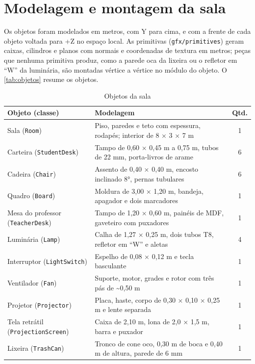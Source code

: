\documentclass[
  12pt,          %
  oneside,       %
  a4paper,       %
  chapter=TITLE, %
  english,
  brazil,        %
]{abntex2}
\newcommand{\fonteautores}{\fonte{Elaborado pelos autores (2026).}}
\begin{document}
\chapter{Modelagem e montagem da sala}
\label{cap:modelagem}

Os objetos foram modelados em metros, com Y para cima, e com a frente de cada objeto voltada para +Z no
espaço local. As primitivas (\texttt{gfx/primitives}) geram caixas, cilindros e planos com normais e
coordenadas de textura em metros; peças que nenhuma primitiva produz, como a parede oca da lixeira ou o
refletor em ``W'' da luminária, são montadas vértice a vértice no módulo do objeto. O \autoref{tab:objetos}
resume os objetos.

\begin{table}[htb]
  \centering
  \caption{Objetos da sala}
  \label{tab:objetos}
  \footnotesize
  \begin{tabularx}{\textwidth}{|l|X|c|}
    \hline
    \textbf{Objeto (classe)} & \textbf{Modelagem} & \textbf{Qtd.} \\
    \hline
    Sala (\texttt{Room}) & Piso, paredes e teto com espessura, rodapés; interior de 8 × 3 × 7 m & 1 \\
    Carteira (\texttt{StudentDesk}) & Tampo de 0,60 × 0,45 m a 0,75 m, tubos de 22 mm, porta-livros de arame & 6 \\
    Cadeira (\texttt{Chair}) & Assento de 0,40 × 0,40 m, encosto inclinado 8°, pernas tubulares & 6 \\
    Quadro (\texttt{Board}) & Moldura de 3,00 × 1,20 m, bandeja, apagador e dois marcadores & 1 \\
    Mesa do professor (\texttt{TeacherDesk}) & Tampo de 1,20 × 0,60 m, painéis de MDF, gaveteiro com puxadores & 1 \\
    Luminária (\texttt{Lamp}) & Calha de 1,27 × 0,25 m, dois tubos T8, refletor em ``W'' e aletas & 4 \\
    Interruptor (\texttt{LightSwitch}) & Espelho de 0,08 × 0,12 m e tecla basculante & 1 \\
    Ventilador (\texttt{Fan}) & Suporte, motor, grades e rotor com três pás de \textasciitilde 0,50 m & 1 \\
    Projetor (\texttt{Projector}) & Placa, haste, corpo de 0,30 × 0,10 × 0,25 m e lente separada & 1 \\
    Tela retrátil (\texttt{ProjectionScreen}) & Caixa de 2,10 m, lona de 2,0 × 1,5 m, barra e puxador & 1 \\
    Lixeira (\texttt{TrashCan}) & Tronco de cone oco, 0,30 m de boca e 0,40 m de altura, parede de 6 mm & 1 \\
    \hline
  \end{tabularx}
  \fonteautores
\end{table}
\end{document}
